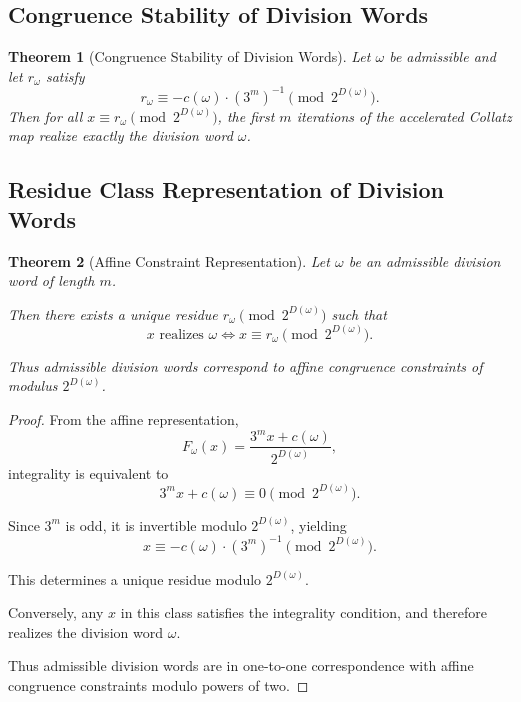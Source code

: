 \documentclass[12pt, oneside]{article}
\numberwithin{equation}{section}
\theoremstyle{definition}
\theoremstyle{plain}
\newtheorem{theorem}{Theorem}[section]
\theoremstyle{remark}
\begin{document}
\subsection{Congruence Stability of Division Words}

\begin{theorem}[Congruence Stability of Division Words]
Let $\omega$ be admissible and let $r_\omega$ satisfy
\[
r_\omega \equiv -c(\omega)\cdot (3^m)^{-1} \pmod{2^{D(\omega)}}.
\]
Then for all $x \equiv r_\omega \pmod{2^{D(\omega)}}$, the first $m$
iterations of the accelerated Collatz map realize exactly the division word $\omega$.
\end{theorem}

\subsection{Residue Class Representation of Division Words}

\begin{theorem}[Affine Constraint Representation]
Let $\omega$ be an admissible division word of length $m$.

Then there exists a unique residue $r_\omega \pmod{2^{D(\omega)}}$ such that
\[
x \text{ realizes } \omega \iff x \equiv r_\omega \pmod{2^{D(\omega)}}.
\]

Thus admissible division words correspond to affine congruence constraints
of modulus $2^{D(\omega)}$.
\end{theorem}

\begin{proof}
From the affine representation,
\[
F_\omega(x) = \frac{3^m x + c(\omega)}{2^{D(\omega)}},
\]
integrality is equivalent to
\[
3^m x + c(\omega) \equiv 0 \pmod{2^{D(\omega)}}.
\]

Since $3^m$ is odd, it is invertible modulo $2^{D(\omega)}$, yielding
\[
x \equiv -c(\omega) \cdot (3^m)^{-1} \pmod{2^{D(\omega)}}.
\]

This determines a unique residue modulo $2^{D(\omega)}$.

Conversely, any $x$ in this class satisfies the integrality condition,
and therefore realizes the division word $\omega$.

Thus admissible division words are in one-to-one correspondence with affine
congruence constraints modulo powers of two.
\end{proof}
\end{document}
